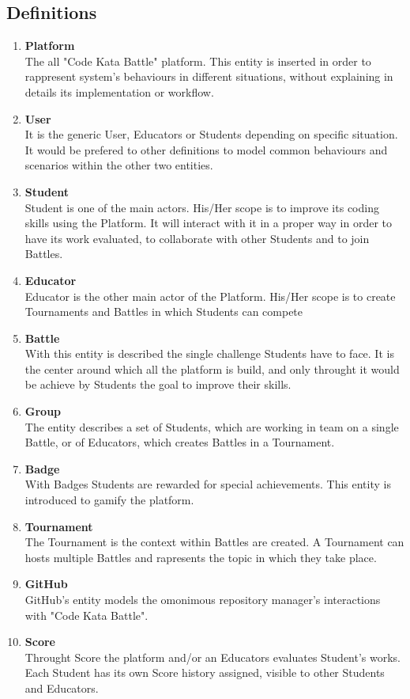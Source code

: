 \documentclass{article}
\begin{document}
\subsection{Definitions}
\begin{enumerate}[label=$\bullet$]
    \item \textbf{Platform}\\The all "Code Kata Battle" platform. This entity is inserted in order to rappresent system's behaviours in different situations, without explaining in details its implementation or workflow.
    \item \textbf{User}\\It is the generic User, Educators or Students depending on specific situation. It would be prefered to other definitions to model common behaviours and scenarios within the other two entities.
    \item \textbf{Student}\\Student is one of the main actors. His/Her scope is to improve its coding skills using the Platform. It will interact with it in a proper way in order to have its work evaluated, to collaborate with other Students and to join Battles.
    \item \textbf{Educator}\\Educator is the other main actor of the Platform. His/Her scope is to create Tournaments and Battles in which Students can compete
    \item \textbf{Battle}\\With this entity is described the single challenge Students have to face. It is the center around which all the platform is build, and only throught it would be achieve by Students the goal to improve their skills.
    \item \textbf{Group}\\The entity describes a set of Students, which are working in team on a single Battle, or of Educators, which creates Battles in a Tournament.
    \item \textbf{Badge}\\With Badges Students are rewarded for special achievements. This entity is introduced to gamify the platform.
    \item \textbf{Tournament}\\The Tournament is the context within Battles are created. A Tournament can hosts multiple Battles and rapresents the topic in which they take place.
    \item \textbf{GitHub}\\GitHub's entity models the omonimous repository manager's interactions with "Code Kata Battle".
    \item \textbf{Score}\\Throught Score the platform and/or an Educators evaluates Student's works. Each Student has its own Score history assigned, visible to other Students and Educators.
\end{enumerate}
\end{document}
